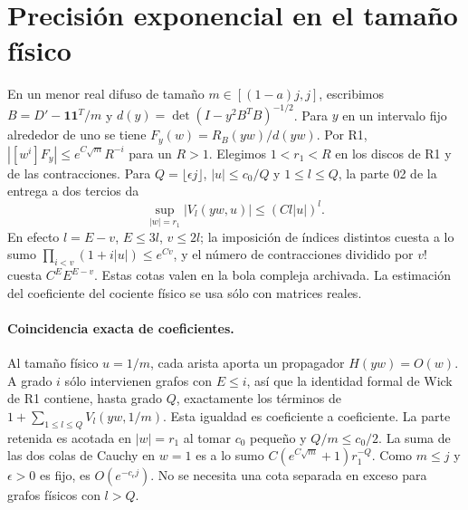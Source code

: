 \section{Precisión exponencial en el tamaño físico}
En un menor real difuso de tamaño $m\in[(1-a)j,j]$, escribimos $B=D'-\mathbf1\mathbf1^T/m$
y $d(y)=\det(I-y^2 B^TB)^{-1/2}$. Para $y$ en un intervalo fijo alrededor de uno se tiene
$F_y(w)=R_B(yw)/d(yw)$. Por R1, $|[w^i]F_y|\le e^{C\sqrt m}R^{-i}$ para un $R>1$.
Elegimos $1<r_1<R$ en los discos de R1 y de las contracciones. Para $Q=\lfloor\epsilon j\rfloor$,
$|u|\le c_0/Q$ y $1\le l\le Q$, la parte 02 de la entrega a dos tercios da
\[
 \sup_{|w|=r_1}|V_l(yw,u)|\le(Cl|u|)^l .
\]
En efecto $l=E-v$, $E\le3l$, $v\le2l$; la imposición de índices distintos cuesta a lo sumo
$\prod_{i<v}(1+i|u|)\le e^{Cv}$, y el número de contracciones dividido por $v!$
cuesta $C^E E^{E-v}$. Estas cotas valen en la bola compleja archivada.
La estimación del coeficiente del cociente físico se usa sólo con matrices reales.
\paragraph{Coincidencia exacta de coeficientes.}
Al tamaño físico $u=1/m$, cada arista aporta un propagador $H(yw)=O(w)$.
A grado $i$ sólo intervienen grafos con $E\le i$, así que la identidad formal de Wick
de R1 contiene, hasta grado $Q$, exactamente los términos de
$1+\sum_{1\le l\le Q}V_l(yw,1/m)$. Esta igualdad es coeficiente a coeficiente.
La parte retenida es acotada en $|w|=r_1$ al tomar $c_0$ pequeño y $Q/m\le c_0/2$.
La suma de las dos colas de Cauchy en $w=1$ es a lo sumo
$C(e^{C\sqrt m}+1)r_1^{-Q}$. Como $m\le j$ y $\epsilon>0$ es fijo, es $O(e^{-c_\epsilon j})$.
No se necesita una cota separada en exceso para grafos físicos con $l>Q$.
